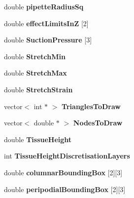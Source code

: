 \begin{DoxyCompactItemize}
\item 
\hypertarget{classSimulation_aee6fb6bd1bbed560039880b174a3a43c}{}double {\bfseries pipette\+Radius\+Sq}\label{classSimulation_aee6fb6bd1bbed560039880b174a3a43c}

\item 
\hypertarget{classSimulation_a70a94dce9bdc0a99a99cab0abe805185}{}double {\bfseries effect\+Limits\+In\+Z} \mbox{[}2\mbox{]}\label{classSimulation_a70a94dce9bdc0a99a99cab0abe805185}

\item 
\hypertarget{classSimulation_aa7b121f145af33dae88b463490aef709}{}double {\bfseries Suction\+Pressure} \mbox{[}3\mbox{]}\label{classSimulation_aa7b121f145af33dae88b463490aef709}

\item 
\hypertarget{classSimulation_a579d17e790d3ea2e470db00e3a732e0c}{}double {\bfseries Stretch\+Min}\label{classSimulation_a579d17e790d3ea2e470db00e3a732e0c}

\item 
\hypertarget{classSimulation_a53227db1a41449ba235979fdd052f42e}{}double {\bfseries Stretch\+Max}\label{classSimulation_a53227db1a41449ba235979fdd052f42e}

\item 
\hypertarget{classSimulation_a76aca0fc8a6de8550af15556d18e6dfb}{}double {\bfseries Stretch\+Strain}\label{classSimulation_a76aca0fc8a6de8550af15556d18e6dfb}

\item 
\hypertarget{classSimulation_aaffbf9ee13e071aa1cdc8e75a0d79774}{}vector$<$ int $\ast$ $>$ {\bfseries Triangles\+To\+Draw}\label{classSimulation_aaffbf9ee13e071aa1cdc8e75a0d79774}

\item 
\hypertarget{classSimulation_aa08434e5c71b265f87aab46be36438be}{}vector$<$ double $\ast$ $>$ {\bfseries Nodes\+To\+Draw}\label{classSimulation_aa08434e5c71b265f87aab46be36438be}

\item 
\hypertarget{classSimulation_adad1e5ce0657d347c8b46a4d1749caa3}{}double {\bfseries Tissue\+Height}\label{classSimulation_adad1e5ce0657d347c8b46a4d1749caa3}

\item 
\hypertarget{classSimulation_aafb36172155cdd675fb7d8cbe057c0ab}{}int {\bfseries Tissue\+Height\+Discretisation\+Layers}\label{classSimulation_aafb36172155cdd675fb7d8cbe057c0ab}

\item 
\hypertarget{classSimulation_a04089e6ccaa912c8ef12780163505b13}{}double {\bfseries columnar\+Bounding\+Box} \mbox{[}2\mbox{]}\mbox{[}3\mbox{]}\label{classSimulation_a04089e6ccaa912c8ef12780163505b13}

\item 
\hypertarget{classSimulation_ae0a6fb9ec7c26faf354de145e18f53e2}{}double {\bfseries peripodial\+Bounding\+Box} \mbox{[}2\mbox{]}\mbox{[}3\mbox{]}\label{classSimulation_ae0a6fb9ec7c26faf354de145e18f53e2}

\end{DoxyCompactItemize}


